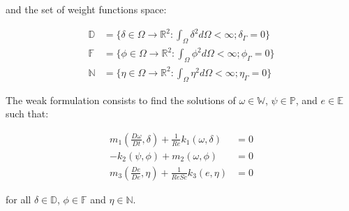 \noindent
and the set of weight functions space:

\begin{equation}
 \begin{aligned}
  \mathbb{D} &= \{\delta \in \Omega \rightarrow \mathbb{R}^2
  : \int_\Omega \delta^2 d\Omega < \infty
  ; \delta_\Gamma = 0\} \\
  \mathbb{F} &= \{\phi \in \Omega \rightarrow \mathbb{R}^2
  : \int_\Omega \phi^2 d\Omega < \infty 
  ; \phi_\Gamma = 0\} \\
  \mathbb{N} &= \{\eta \in \Omega \rightarrow \mathbb{R}^2
  : \int_\Omega \eta^2 d\Omega < \infty 
  ; \eta_\Gamma = 0\}
 \end{aligned}
\end{equation}

\noindent
The weak formulation consists 
to find the solutions of 
$\omega \in \mathbb{W}$,
$\psi \in \mathbb{P}$, and $e \in \mathbb{E}$
such that:

\begin{align}
 \textbf{$m_1$}(\frac{D \omega}{Dt},\delta) 
 + \frac{1}{\textit{Re}}\textbf{$k_1$}(\omega,\delta) 
 & = 0 \\
 - \textbf{$k_2$}(\psi,\phi) 
 + \textbf{$m_2$}(\omega,\phi) 
 & = 0 \\
 \textbf{$m_3$}(\frac{De}{De},\eta) 
 + \frac{1}{\textit{ReSc}}\textbf{$k_3$}(e,\eta) 
 & = 0
\end{align}

\noindent
for all $\delta \in \mathbb{D}$, 
$\phi \in \mathbb{F}$ and 
$\eta \in \mathbb{N}$.

